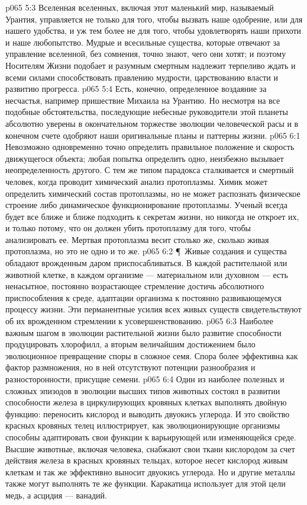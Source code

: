 \vs p065 5:3 Вселенная вселенных, включая этот маленький мир, называемый Урантия, управляется не только для того, чтобы вызвать наше одобрение, или для нашего удобства, и уж тем более не для того, чтобы удовлетворять наши прихоти и наше любопытство. Мудрые и всесильные существа, которые отвечают за управление вселенной, без сомнения, точно знают, чего они хотят; и поэтому Носителям Жизни подобает и разумным смертным надлежит терпеливо ждать и всеми силами способствовать правлению мудрости, царствованию власти и развитию прогресса.
\vs p065 5:4 Есть, конечно, определенное воздаяние за несчастья, например пришествие Михаила на Урантию. Но несмотря на все подобные обстоятельства, последующие небесные руководители этой планеты абсолютно уверены в окончательном торжестве эволюции человеческой расы и в конечном счете одобряют наши оригинальные планы и паттерны жизни.
\vs p065 6:1 Невозможно одновременно точно определить правильное положение и скорость движущегося объекта; любая попытка определить одно, неизбежно вызывает неопределенность другого. С тем же типом парадокса сталкивается и смертный человек, когда проводит химический анализ протоплазмы. Химик может определить химический состав  протоплазмы, но не может распознать физическое строение либо динамическое функционирование  протоплазмы. Ученый всегда будет все ближе и ближе подходить к секретам жизни, но никогда не откроет их, и только потому, что он должен убить протоплазму для того, чтобы анализировать ее. Мертвая протоплазма весит столько же, сколько живая протоплазма, но это не одно и то же.
\vs p065 6:2 \P\ Живые создания и существа обладают врожденным даром приспосабливаться. В каждой  растительной или животной клетке, в каждом  организме --- материальном или духовном --- есть ненасытное, постоянно возрастающее стремление достичь абсолютного приспособления к среде, адаптации организма к постоянно развивающемуся процессу жизни. Эти перманентные усилия всех живых существ свидетельствуют об их врожденном стремлении к усовершенствованию.
\vs p065 6:3 Наиболее важным шагом в эволюции растительной жизни было развитие способности продуцировать хлорофилл, а вторым величайшим достижением было эволюционное превращение споры в сложное семя. Спора более эффективна как фактор размножения, но в ней отсутствуют потенции разнообразия и разносторонности, присущие семени.
\vs p065 6:4 Один из наиболее полезных и сложных эпизодов в эволюции высших типов животных состоял в развитии способности железа в циркулирующих кровяных клетках выполнять двойную функцию: переносить кислород и выводить двуокись углерода. И это свойство красных кровяных телец иллюстрирует, как эволюционирующие организмы способны адаптировать свои функции к варьирующей или изменяющейся среде. Высшие животные, включая человека, снабжают свои ткани кислородом за счет действия железа в красных кровяных тельцах, которое несет кислород живым клеткам и так же эффективно выносит двуокись углерода. Но и другие металлы также могут выполнять те же функции. Каракатица использует для этой цели медь, а асцидия --- ванадий.
